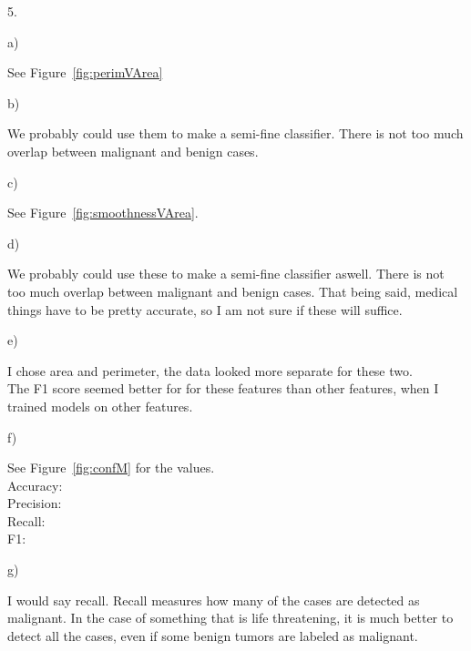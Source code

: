 \documentclass[a4paper,12pt]{article}
\newlength{\QNo}
\begin{document}
5. 
\begin{minipage}[t]{0.95\dimexpr\textwidth}
  a)
  \begin{minipage}[t]{0.9\dimexpr\textwidth}
      See Figure~\ref{fig:perimVArea}\\
  \end{minipage}

  b)
  \begin{minipage}[t]{0.9\dimexpr\textwidth-\QNo}
    We probably could use them to make a semi-fine classifier.
    There is not too much overlap between malignant and benign cases.\\
  \end{minipage}

  c)
  \begin{minipage}[t]{0.9\dimexpr\textwidth-\QNo}
      See Figure~\ref{fig:smoothnessVArea}.\\
  \end{minipage}

  d)
  \begin{minipage}[t]{0.9\dimexpr\textwidth-\QNo}
    We probably could use these to make a semi-fine classifier aswell.
    There is not too much overlap between malignant and benign cases.
    That being said, medical things have to be pretty accurate, so I am not sure if these will suffice.\\
  \end{minipage}

  e)
  \begin{minipage}[t]{0.9\dimexpr\textwidth-\QNo}
    I chose area and perimeter, the data looked more separate for these two.\\
    The F1 score seemed better for for these features than other features, when I trained models on other features.\\
  \end{minipage}

  f)
  \begin{minipage}[t]{0.9\dimexpr\textwidth-\QNo}
    See Figure~\ref{fig:confM} for the values.\\
    Accuracy: \\
    Precision: \\
    Recall: \\
    F1: \\
  \end{minipage}

  g)
  \begin{minipage}[t]{0.9\dimexpr\textwidth-\QNo}
    I would say recall.
    Recall measures how many of the cases are detected as malignant.
    In the case of something that is life threatening, it is much better to detect all the cases,
    even if some benign tumors are labeled as malignant.\\
  \end{minipage}
\end{minipage}
\end{document}
